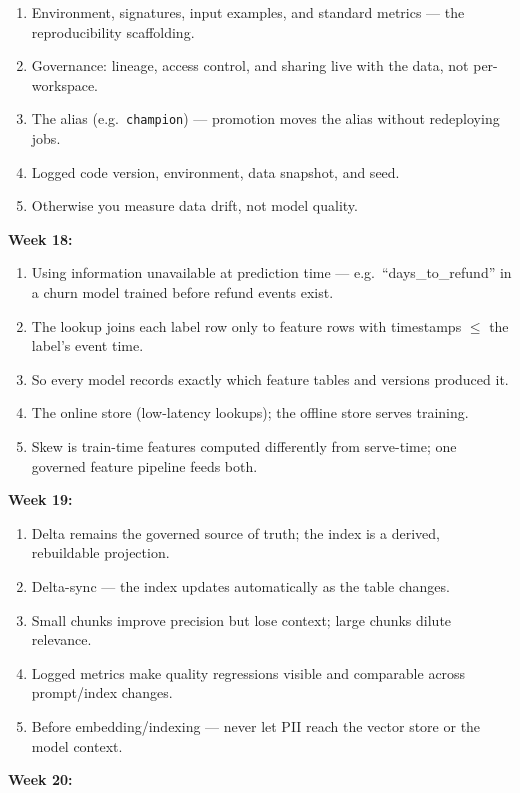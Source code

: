 \documentclass[11pt, a4paper]{article}
\begin{document}
\begin{enumerate}[itemsep=0pt, leftmargin=2em]
    \item Environment, signatures, input examples, and standard metrics --- the reproducibility scaffolding.
    \item Governance: lineage, access control, and sharing live with the data, not per-workspace.
    \item The alias (e.g.\ \texttt{champion}) --- promotion moves the alias without redeploying jobs.
    \item Logged code version, environment, data snapshot, and seed.
    \item Otherwise you measure data drift, not model quality.
\end{enumerate}
\noindent\textbf{Week 18:}
\begin{enumerate}[itemsep=0pt, leftmargin=2em]
    \item Using information unavailable at prediction time --- e.g.\ ``days\_to\_refund'' in a churn model trained before refund events exist.
    \item The lookup joins each label row only to feature rows with timestamps $\le$ the label's event time.
    \item So every model records exactly which feature tables and versions produced it.
    \item The online store (low-latency lookups); the offline store serves training.
    \item Skew is train-time features computed differently from serve-time; one governed feature pipeline feeds both.
\end{enumerate}
\noindent\textbf{Week 19:}
\begin{enumerate}[itemsep=0pt, leftmargin=2em]
    \item Delta remains the governed source of truth; the index is a derived, rebuildable projection.
    \item Delta-sync --- the index updates automatically as the table changes.
    \item Small chunks improve precision but lose context; large chunks dilute relevance.
    \item Logged metrics make quality regressions visible and comparable across prompt/index changes.
    \item Before embedding/indexing --- never let PII reach the vector store or the model context.
\end{enumerate}
\noindent\textbf{Week 20:}
\end{document}
